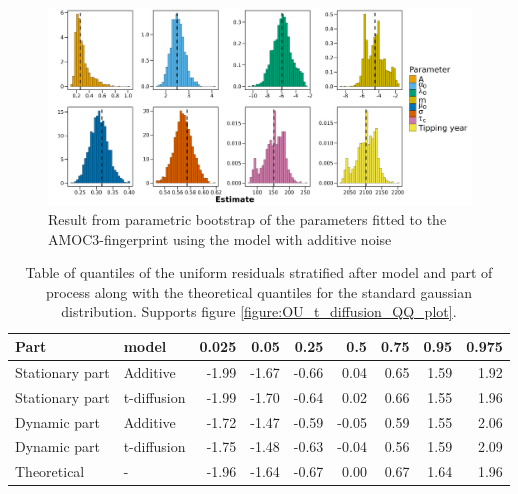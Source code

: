 \begin{figure}[h!]
    \begin{center}
        \includegraphics[scale = .095]{figures/estim_tibble_AMOC3_plot.jpeg}
        \caption{Result from parametric bootstrap of the parameters fitted to the AMOC3-fingerprint using the model with additive noise\\}
        \label{figure:AMOC3_additive_bootstrap}
    \end{center}
\end{figure}
\begin{table}[ht]
    \centering
    \begin{tabular}{llrrrrrrr}
      \hline
    Part & model & 0.025 & 0.05 & 0.25 & 0.5 & 0.75 & 0.95 & 0.975 \\ 
      \hline
    Stationary part & Additive & -1.99 & -1.67 & -0.66 & 0.04 & 0.65 & 1.59 & 1.92 \\ 
      Stationary part & t-diffusion & -1.99 & -1.70 & -0.64 & 0.02 & 0.66 & 1.55 & 1.96 \\ 
      Dynamic part & Additive & -1.72 & -1.47 & -0.59 & -0.05 & 0.59 & 1.55 & 2.06 \\ 
      Dynamic part & t-diffusion & -1.75 & -1.48 & -0.63 & -0.04 & 0.56 & 1.59 & 2.09 \\ 
      Theoretical & - & -1.96 & -1.64 & -0.67 & 0.00 & 0.67 & 1.64 & 1.96 \\ 
       \hline
    \end{tabular}
    \caption{Table of quantiles of the uniform residuals stratified after model and part of process along with the theoretical quantiles for the standard gaussian distribution. Supports figure \ref{figure:OU_t_diffusion_QQ_plot}.}
    \label{table:QQ_OU_vs_t_diffusion}
\end{table}
\clearpage
